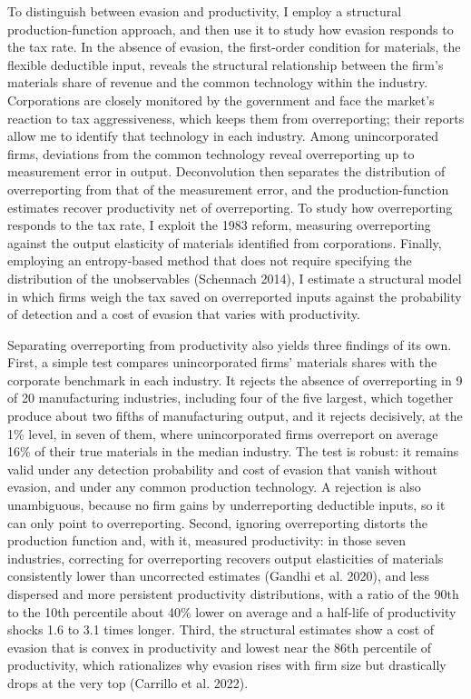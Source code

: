 \documentclass[
  12pt,
  letterpaper,
  oneside,
  openany]{report}
\begin{document}
To distinguish between evasion and productivity, I employ a structural
production-function approach, and then use it to study how evasion
responds to the tax rate. In the absence of evasion, the first-order
condition for materials, the flexible deductible input, reveals the
structural relationship between the firm's materials share of revenue
and the common technology within the industry. Corporations are closely
monitored by the government and face the market's reaction to tax
aggressiveness, which keeps them from overreporting; their reports allow
me to identify that technology in each industry. Among unincorporated
firms, deviations from the common technology reveal overreporting up to
measurement error in output. Deconvolution then separates the
distribution of overreporting from that of the measurement error, and
the production-function estimates recover productivity net of
overreporting. To study how overreporting responds to the tax rate, I
exploit the 1983 reform, measuring overreporting against the output
elasticity of materials identified from corporations. Finally, employing
an entropy-based method that does not require specifying the
distribution of the unobservables (Schennach 2014), I estimate a
structural model in which firms weigh the tax saved on overreported
inputs against the probability of detection and a cost of evasion that
varies with productivity.

Separating overreporting from productivity also yields three findings of
its own. First, a simple test compares unincorporated firms' materials
shares with the corporate benchmark in each industry. It rejects the
absence of overreporting in 9 of 20 manufacturing industries, including
four of the five largest, which together produce about two fifths of
manufacturing output, and it rejects decisively, at the 1\% level, in
seven of them, where unincorporated firms overreport on average 16\% of
their true materials in the median industry. The test is robust: it
remains valid under any detection probability and cost of evasion that
vanish without evasion, and under any common production technology. A
rejection is also unambiguous, because no firm gains by underreporting
deductible inputs, so it can only point to overreporting. Second,
ignoring overreporting distorts the production function and, with it,
measured productivity: in those seven industries, correcting for
overreporting recovers output elasticities of materials consistently
lower than uncorrected estimates (Gandhi et al. 2020), and less
dispersed and more persistent productivity distributions, with a ratio
of the 90th to the 10th percentile about 40\% lower on average and a
half-life of productivity shocks 1.6 to 3.1 times longer. Third, the
structural estimates show a cost of evasion that is convex in
productivity and lowest near the 86th percentile of productivity, which
rationalizes why evasion rises with firm size but drastically drops at
the very top (Carrillo et al. 2022).
\end{document}
